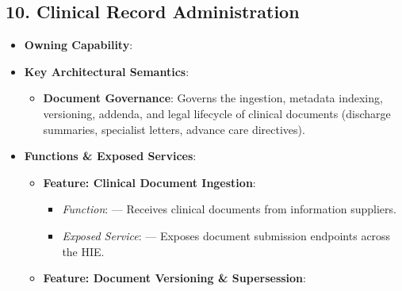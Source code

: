 \par\smallskip
{}\label{rad:sa:162}
\subsection*{10. Clinical Record Administration}
\label{rad:sa:163}

\begin{itemize}

\item
\textbf{Owning Capability}: \texttt{}



\item
\textbf{Key Architectural Semantics}:


\begin{itemize}

\item
\textbf{Document Governance}: Governs the ingestion, metadata indexing, versioning, addenda, and legal lifecycle of clinical documents (discharge summaries, specialist letters, advance care directives).



\end{itemize}


\item
\textbf{Functions \& Exposed Services}:


\begin{itemize}

\item
\textbf{Feature: Clinical Document Ingestion}:


\begin{itemize}

\item
\emph{Function}: \texttt{} — Receives clinical documents from information suppliers.



\item
\emph{Exposed Service}: \texttt{} — Exposes document submission endpoints across the HIE.



\end{itemize}


\item
\textbf{Feature: Document Versioning \& Supersession}:


\begin{itemize}


\end{itemize}
\end{itemize}
\end{itemize}
